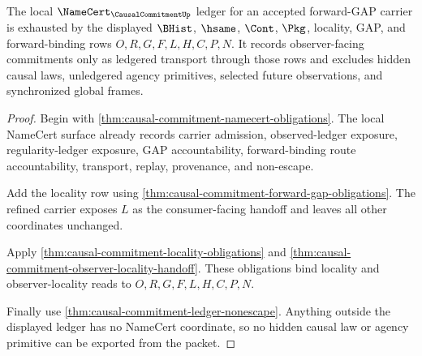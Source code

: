 \begin{theorem}
\label{thm:causal-commitment-namecert-ledger}
The local $\NameCert_{\CausalCommitmentUp}$ ledger for an accepted forward-GAP carrier is exhausted by the displayed $\BHist$, $\hsame$, $\Cont$, $\Pkg$, locality, GAP, and forward-binding rows $O,R,G,F,L,H,C,P,N$. It records observer-facing commitments only as ledgered transport through those rows and excludes hidden causal laws, unledgered agency primitives, selected future observations, and synchronized global frames.
\end{theorem}
\begin{proof}
Begin with \autoref{thm:causal-commitment-namecert-obligations}. The local NameCert surface already records carrier admission, observed-ledger exposure, regularity-ledger exposure, GAP accountability, forward-binding route accountability, transport, replay, provenance, and non-escape.

Add the locality row using \autoref{thm:causal-commitment-forward-gap-obligations}. The refined carrier exposes $L$ as the consumer-facing handoff and leaves all other coordinates unchanged.

Apply \autoref{thm:causal-commitment-locality-obligations} and \autoref{thm:causal-commitment-observer-locality-handoff}. These obligations bind locality and observer-locality reads to $O,R,G,F,L,H,C,P,N$.

Finally use \autoref{thm:causal-commitment-ledger-nonescape}. Anything outside the displayed ledger has no NameCert coordinate, so no hidden causal law or agency primitive can be exported from the packet.
\end{proof}

